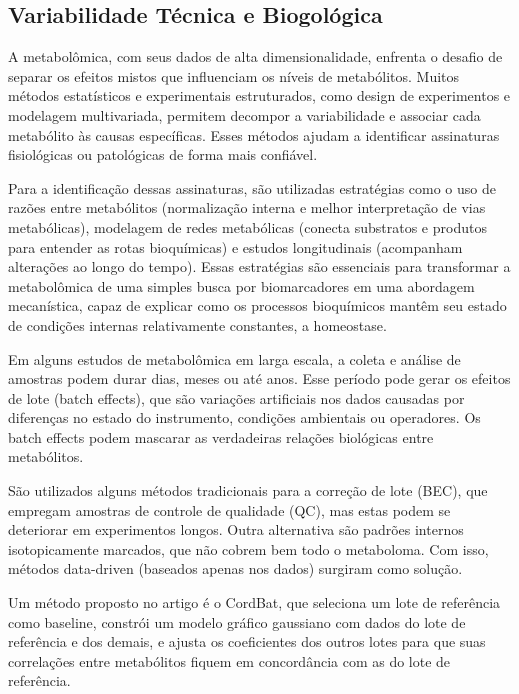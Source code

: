 \subsection{Variabilidade Técnica e Biogológica}

A metabolômica, com seus dados de alta dimensionalidade, enfrenta o desafio de separar os efeitos mistos que influenciam os níveis de metabólitos. Muitos métodos estatísticos e experimentais estruturados, como design de experimentos e modelagem multivariada, permitem decompor a variabilidade e associar cada metabólito às causas específicas. Esses métodos ajudam a identificar assinaturas fisiológicas ou patológicas de forma mais confiável\cite{boccard2023we}.

Para a identificação dessas assinaturas, são utilizadas estratégias como o uso de razões entre metabólitos (normalização interna e melhor interpretação de vias metabólicas), modelagem de redes metabólicas (conecta substratos e produtos para entender as rotas bioquímicas) e estudos longitudinais (acompanham alterações ao longo do tempo). Essas estratégias são essenciais para transformar a metabolômica de uma simples busca por biomarcadores em uma abordagem mecanística, capaz de explicar como os processos bioquímicos mantêm seu estado de condições internas relativamente constantes, a homeostase\cite{boccard2023we}.

Em alguns estudos de metabolômica em larga escala, a coleta e análise de amostras podem durar dias, meses ou até anos. Esse período pode gerar os efeitos de lote (batch effects), que são variações artificiais nos dados causadas por diferenças no estado do instrumento, condições ambientais ou operadores. Os batch effects podem mascarar as verdadeiras relações biológicas entre metabólitos\cite{guo2023concordance}. 

São utilizados alguns métodos tradicionais para a correção de lote (BEC), que empregam amostras de controle de qualidade (QC), mas estas podem se deteriorar em experimentos longos. Outra alternativa são padrões internos isotopicamente marcados, que não cobrem bem todo o metaboloma. Com isso, métodos data-driven (baseados apenas nos dados) surgiram como solução\cite{guo2023concordance}.

Um método proposto no artigo\cite{guo2023concordance} é o CordBat, que seleciona um lote de referência como baseline, constrói um modelo gráfico gaussiano com dados do lote de referência e dos demais, e ajusta os coeficientes dos outros lotes para que suas correlações entre metabólitos fiquem em concordância com as do lote de referência.

